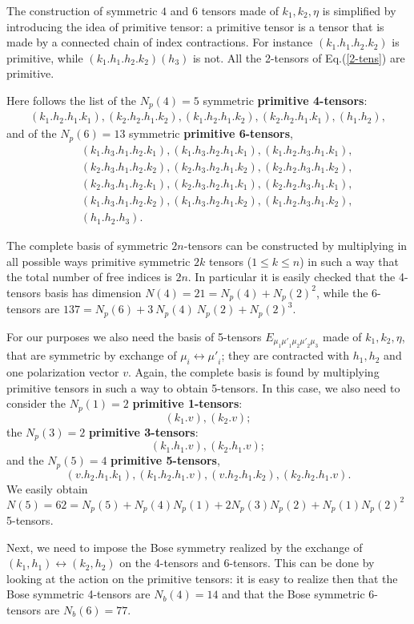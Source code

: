 \documentclass[11pt]{article}
\newcommand{\beq}{\begin{equation}}
\newcommand{\eeq}{\end{equation}}
\newcommand{\bea}{\begin{eqnarray}}
\newcommand{\eea}{\end{eqnarray}}
\def\nl{\nonumber\\}
\newcommand{\ntp}[1]{{N_p(#1)}} %
\newcommand{\nta}[1]{{N(#1)}}   %
\newcommand{\ntb}[1]{{N_b(#1)}} %
\def\mup{{\mu'}}    %
\def\gflat{{\eta}}  %
\begin{document}
The  construction of  symmetric $4$ and $6$ tensors made of $k_1,k_2,\gflat$ 
is simplified by introducing the idea of primitive tensor: 
a primitive tensor is a tensor that is made by a connected chain of  
index contractions.  
For instance $(k_1.h_1.h_2.k_2)$ is primitive,  
while $(k_1.h_1.h_2.k_2)(h_3)$ is not. 
All the 2-tensors of Eq.(\ref{2-tens}) are primitive. 

Here follows the  list of the $\ntp{4}=5$ symmetric {\bf primitive 4-tensors}:
\bea 
(k_1.h_2.h_1.k_1),(k_2.h_2.h_1.k_2),(k_1.h_2.h_1.k_2),(k_2.h_2.h_1.k_1), 
(h_1.h_2),
 \eea 
and of the $\ntp{6}=13$ symmetric {\bf primitive 6-tensors},
\bea& &(k_1.h_3.h_1.h_2.k_1),(k_1.h_3.h_2.h_1.k_1),(k_1.h_2.h_3.h_1.k_1),\nl 
& &(k_2.h_3.h_1.h_2.k_2),(k_2.h_3.h_2.h_1.k_2),(k_2.h_2.h_3.h_1.k_2),\nl 
& &(k_2.h_3.h_1.h_2.k_1),(k_2.h_3.h_2.h_1.k_1),(k_2.h_2.h_3.h_1.k_1),\nl 
& &(k_1.h_3.h_1.h_2.k_2),(k_1.h_3.h_2.h_1.k_2),(k_1.h_2.h_3.h_1.k_2),\nl 
& &(h_1.h_2.h_3) 
. 
\eea 
 
The complete basis of symmetric $2n$-tensors can be constructed by  
multiplying in all possible ways primitive  
symmetric $2 k$ tensors ($1\leq k\leq n$)  
in such a way that the total number of free indices is $2n$. 
In particular it is easily checked that the  4-tensors basis has  
dimension $\nta{4}=21=\ntp{4}+\ntp{2}^2$,  
while the 6-tensors are $137= \ntp{6}+ 3\ \ntp{4}\ \ntp{2}+\ntp{2}^3$.   
  
For our purposes we also need  the basis  
of 5-tensors $E_{\mu_1\mup_1 \mu_2 \mup_2 \mu_3}$ made of  
$k_1,k_2,\gflat$, that are
symmetric by exchange of $\mu_i \leftrightarrow \mup_i$; they 
are contracted with $h_1,h_2$ and one polarization vector $v$. 
Again, the complete basis is found by multiplying 
primitive tensors in such a way to obtain 5-tensors. 
In this case, we also need to consider the $\ntp{1}=2$  
{\bf primitive 1-tensors}:
\beq 
 (k_1.v), (k_2.v);
\eeq 
the $\ntp{3}=2$ {\bf primitive 3-tensors}:  
\beq 
(k_1.h_1.v),(k_2.h_1.v);
\eeq   
and the $\ntp{5}=4$ {\bf primitive 5-tensors},
\beq 
(v.h_2.h_1.k_1),(k_1.h_2.h_1.v),(v.h_2.h_1.k_2),(k_2.h_2.h_1.v). 
\eeq   
We easily obtain   
$\nta{5}=62=\ntp{5}+\ntp{4}\ntp{1}+2\ntp{3}\ntp{2}+\ntp{1}\ntp{2}^2$  
5-tensors. 
 
Next, we need to impose the Bose symmetry  
realized by the exchange of $(k_1,h_1)\leftrightarrow (k_2,h_2)$
on the 4-tensors and 6-tensors. This can be done by looking at  
the action on the primitive tensors: it is easy to realize
then that the  
Bose symmetric 4-tensors are $\ntb{4}=14$ and that the  
Bose symmetric 6-tensors are $\ntb{6}=77$.  
  
\end{document}
